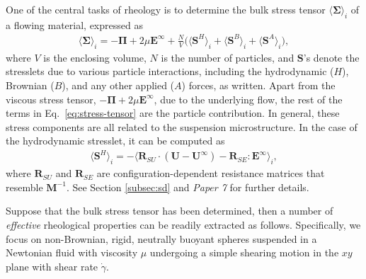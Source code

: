One of the central tasks of rheology is to determine the bulk stress tensor $\langle \bm{\Sigma} \rangle_i$ of a flowing material, expressed as \citep{batchelor_1970, batchelor_1977}
\begin{equation} \label{eq:stress-tensor}
  \begin{aligned}
    \langle \bm{\Sigma} \rangle_i = -\bm{\Pi} +2\mu \bm{E}^\infty + \frac{N}{V} 
    \bigg(\langle \bm{S}^H \rangle_i + \langle \bm{S}^B \rangle_i +\langle \bm{S}^A \rangle_i \bigg), 
  \end{aligned}
\end{equation} 
where $V$ is the enclosing volume,
$N$ is the number of particles,
and $\bm{S}$'s denote the stresslets due to various particle interactions, including the hydrodynamic ($H$), Brownian ($B$), and any other applied ($A$) forces, as written.
Apart from the viscous stress tensor, $-\bm{\Pi} +2\mu \bm{E}^\infty$, due to the underlying flow, the rest of the terms in Eq.\ \eqref{eq:stress-tensor} are the particle contribution.
In general, these stress components are all related to the suspension microstructure.
In the case of the hydrodynamic stresslet, it can be computed as
\begin{equation} 
  \begin{aligned}
    \langle \bm{S}^H \rangle_i = - \langle \bm{R}_{SU}\cdot(\bm{U}-\bm{U}^\infty) - \bm{R}_{SE}:\bm{E}^\infty \rangle_i , 
  \end{aligned}
\end{equation}
where $\bm{R}_{SU}$ and $\bm{R}_{SE}$ are configuration-dependent resistance matrices that resemble $\bm{M}^{-1}$.
See Section \ref{subsec:sd} and \emph{Paper 7} for further details.

\bigskip
Suppose that the bulk stress tensor has been determined, then a number of \emph{effective} rheological properties can be readily extracted as follows.
Specifically, we focus on non-Brownian, rigid, neutrally buoyant spheres suspended in a Newtonian fluid with viscosity $\mu$ undergoing a simple shearing motion in the $xy$ plane with shear rate $\dot{\gamma}$.

